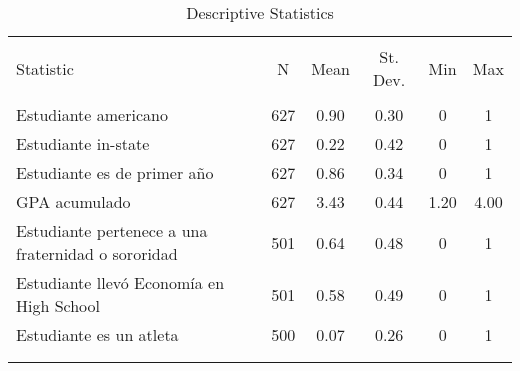 
\begin{table}[!htbp] \centering 
  \caption{Descriptive Statistics} 
  \label{} 
\begin{tabular}{@{\extracolsep{5pt}}lccccc} 
\\[-1.8ex]\hline 
\hline \\[-1.8ex] 
Statistic & \multicolumn{1}{c}{N} & \multicolumn{1}{c}{Mean} & \multicolumn{1}{c}{St. Dev.} & \multicolumn{1}{c}{Min} & \multicolumn{1}{c}{Max} \\ 
\hline \\[-1.8ex] 
Estudiante americano & 627 & 0.90 & 0.30 & 0 & 1 \\ 
Estudiante in-state & 627 & 0.22 & 0.42 & 0 & 1 \\ 
Estudiante es de primer año & 627 & 0.86 & 0.34 & 0 & 1 \\ 
GPA acumulado & 627 & 3.43 & 0.44 & 1.20 & 4.00 \\ 
Estudiante pertenece a una fraternidad o sororidad & 501 & 0.64 & 0.48 & 0 & 1 \\ 
Estudiante llevó Economía en High School & 501 & 0.58 & 0.49 & 0 & 1 \\ 
Estudiante es un atleta & 500 & 0.07 & 0.26 & 0 & 1 \\ 
\hline \\[-1.8ex] 
\multicolumn{6}{r}{} \\ 
\end{tabular} 
\end{table} 
